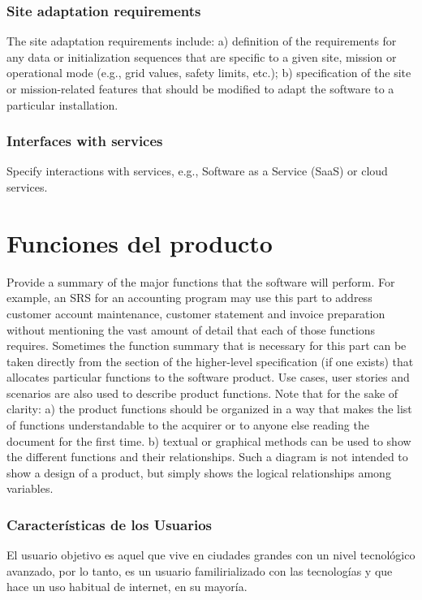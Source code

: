 \documentclass[12pt, a4paper, twoside]{article}
\begin{document}
\subsubsection{Site adaptation requirements}
The site adaptation requirements include:
a) definition of the requirements for any data or initialization sequences that are specific to a given
site, mission or operational mode (e.g., grid values, safety limits, etc.);
b) specification of the site or mission-related features that should be modified to adapt the software
to a particular installation.

\subsubsection{Interfaces with services}
Specify interactions with services, e.g., Software as a Service (SaaS) or cloud services.


\section{Funciones del producto}
Provide a summary of the major functions that the software will perform. For example, an SRS for an
accounting program may use this part to address customer account maintenance, customer statement
and invoice preparation without mentioning the vast amount of detail that each of those functions
requires.
Sometimes the function summary that is necessary for this part can be taken directly from the section
of the higher-level specification (if one exists) that allocates particular functions to the software
product.
Use cases, user stories and scenarios are also used to describe product functions.
Note that for the sake of clarity:
a) the product functions should be organized in a way that makes the list of functions understandable
to the acquirer or to anyone else reading the document for the first time.
b) textual or graphical methods can be used to show the different functions and their relationships.
Such a diagram is not intended to show a design of a product, but simply shows the logical
relationships among variables.

 \subsubsection{Características de los Usuarios}
 El usuario objetivo es aquel que vive en ciudades grandes con un nivel tecnológico avanzado,
 por lo tanto, es un usuario familirializado con las tecnologías y que hace un uso
 habitual de internet, en su mayoría.
\end{document}
